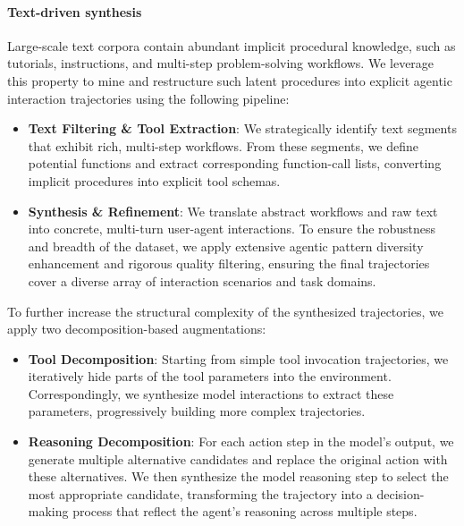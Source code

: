 \documentclass{article}
\begin{document}
\paragraph{Text-driven synthesis}
Large-scale text corpora contain abundant implicit procedural knowledge, such as tutorials, instructions, and multi-step problem-solving workflows.
We leverage this property to mine and restructure such latent procedures into explicit agentic interaction trajectories using the following pipeline:
\begin{itemize}
    \item \textbf{Text Filtering \& Tool Extraction}:  
    We strategically identify text segments that exhibit rich, multi-step workflows. From these segments, we define potential functions and extract corresponding function-call lists, converting implicit procedures into explicit tool schemas.
    
    \item \textbf{Synthesis \& Refinement}:  
    We translate abstract workflows and raw text into concrete, multi-turn user-agent interactions. To ensure the robustness and breadth of the dataset, we apply extensive agentic pattern diversity enhancement and rigorous quality filtering, ensuring the final trajectories cover a diverse array of interaction scenarios and task domains.
\end{itemize}
To further increase the structural complexity of the synthesized trajectories, we apply two decomposition-based augmentations:

\begin{itemize}
    \item \textbf{Tool Decomposition}:  
    Starting from simple tool invocation trajectories, we iteratively hide parts of the tool parameters into the environment. 
    Correspondingly, we synthesize model interactions to extract these parameters, progressively building more complex trajectories.
    
    \item \textbf{Reasoning Decomposition}:  
    For each action step in the model’s output, we generate multiple alternative candidates and replace the original action with these alternatives. 
    We then synthesize the model reasoning step to select the most appropriate candidate, transforming the trajectory into a decision-making process that reflect the agent’s reasoning across multiple steps.
\end{itemize}
\end{document}
